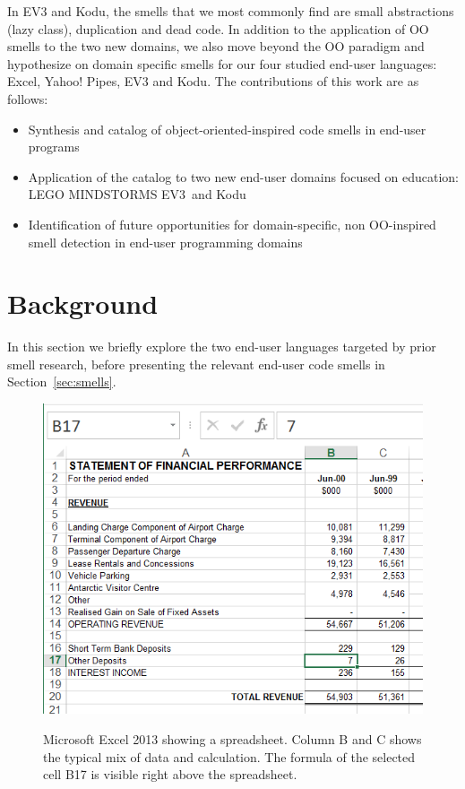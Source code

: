 \documentclass{sig-alternate}
\newcommand{\ms}{LEGO MINDSTORMS EV3}
\begin{document}
In EV3 and Kodu, the smells that we most commonly find are small abstractions (lazy class), duplication and dead code. In addition to the application of OO smells to the two new domains, we also move beyond the OO paradigm and hypothesize on domain specific smells for our four studied end-user languages: Excel, Yahoo! Pipes, EV3 and Kodu. The contributions of this work are as follows:

\begin{itemize}
	\item Synthesis and catalog of object-oriented-inspired code smells in end-user programs
	\item Application of the catalog to two new end-user domains focused on education: \ms~and Kodu
	\item Identification of future opportunities for domain-specific, non OO-inspired smell detection in end-user programming domains
\end{itemize}


\section{Background}
\label{sec:background}
In this section we briefly explore the two end-user languages targeted by prior smell research, before presenting the relevant end-user code smells in Section~\ref{sec:smells}.



\begin{figure}
\caption{Microsoft Excel 2013 showing a spreadsheet. Column B and C shows the typical mix of data and calculation. The formula of the selected cell B17 is visible right above the spreadsheet.}
\centering
\includegraphics[width=\columnwidth]{img/excel-2}
\label{fig:spreadsheetexample}
\end{figure}
\end{document}
